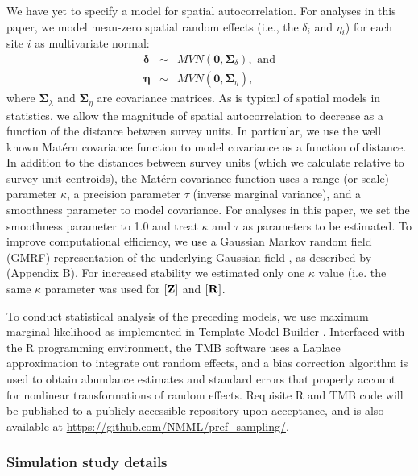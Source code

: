 \documentclass[times,mee,doublespace,]{besauth2}
\begin{document}
\begin{flushleft}
\hspace{0.5in} We have yet to specify a model for spatial autocorrelation.  For analyses in this paper, we model mean-zero spatial random effects (i.e., the $\delta_i$ and $\eta_i$) for each site $i$ as multivariate normal:
\begin{eqnarray*}
  \boldsymbol{\delta} & \sim & MVN(\textbf{0},\boldsymbol{\Sigma}_{\delta}), \text{ and} \\
  \boldsymbol{\eta} & \sim & MVN(\textbf{0},\boldsymbol{\Sigma}_{\eta}),
\end{eqnarray*}
where $\boldsymbol{\Sigma}_{\lambda}$ and $\boldsymbol{\Sigma}_{\eta}$ are covariance matrices.  As is typical of spatial models in statistics, we allow the magnitude of spatial autocorrelation to decrease as a function of the distance between survey units.  In particular, we use the well known Mat\'{e}rn covariance function to model covariance as a function of distance.  In addition to the distances between survey units (which we calculate relative to survey unit centroids), the Mat\'{e}rn covariance function uses a range (or scale) parameter $\kappa$, a precision parameter $\tau$ (inverse marginal variance), and a smoothness parameter to model covariance.  For analyses in this paper, we set the smoothness parameter to 1.0 and treat $\kappa$ and $\tau$ as parameters to be estimated.  To improve computational efficiency, we use a Gaussian Markov random field (GMRF) representation of the underlying Gaussian field \citep{LindgrenEtAl2011}, as described by \citet{ThorsonEtAl2015} (Appendix B).  For increased stability we estimated only one $\kappa$ value (i.e. the same $\kappa$ parameter was used for $[{\bf Z}]$ and $[{\bf R}]$.

\hspace{0.5in} To conduct statistical analysis of the preceding models, we use maximum marginal likelihood as implemented in Template Model Builder \citep[TMB; ][]{KristensenEtAl2016}. Interfaced with the R programming environment, the TMB software uses a Laplace approximation to integrate out random effects, and a bias correction algorithm \citep{TierneyEtAl1989,ThorsonKristensen2016} is used to obtain abundance estimates and standard errors that properly account for nonlinear transformations of random effects.  Requisite R and TMB code will be published to a publicly accessible repository upon acceptance, and is also available at \url{https://github.com/NMML/pref_sampling/}.

\subsubsection*{Simulation study details}


\end{flushleft}
\end{document}
